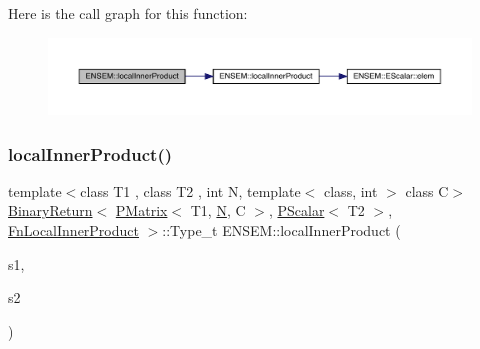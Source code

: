 Here is the call graph for this function\+:\nopagebreak
\begin{figure}[H]
\begin{center}
\leavevmode
\includegraphics[width=350pt]{df/d0a/group__primmatrix_ga8ba784b1249c948dcff5b8fe086e2eb5_cgraph}
\end{center}
\end{figure}
\mbox{\label{group__primmatrix_gafc7ce30ddacb0b13e2db237cfa268161}} 
\subsubsection{\texorpdfstring{localInnerProduct()}{localInnerProduct()}\hspace{0.1cm}{\footnotesize\ttfamily [2/3]}}
{\footnotesize\ttfamily template$<$class T1 , class T2 , int N, template$<$ class, int $>$ class C$>$ \\
\mbox{\hyperlink{structENSEM_1_1BinaryReturn}{Binary\+Return}}$<$ \mbox{\hyperlink{classENSEM_1_1PMatrix}{P\+Matrix}}$<$ T1, \mbox{\hyperlink{operator__name__util_8cc_a7722c8ecbb62d99aee7ce68b1752f337}{N}}, C $>$, \mbox{\hyperlink{classENSEM_1_1PScalar}{P\+Scalar}}$<$ T2 $>$, \mbox{\hyperlink{structENSEM_1_1FnLocalInnerProduct}{Fn\+Local\+Inner\+Product}} $>$\+::Type\+\_\+t E\+N\+S\+E\+M\+::local\+Inner\+Product (\begin{DoxyParamCaption}\item[{const \mbox{\hyperlink{classENSEM_1_1PMatrix}{P\+Matrix}}$<$ T1, \mbox{\hyperlink{operator__name__util_8cc_a7722c8ecbb62d99aee7ce68b1752f337}{N}}, C $>$ \&}]{s1,  }\item[{const \mbox{\hyperlink{classENSEM_1_1PScalar}{P\+Scalar}}$<$ T2 $>$ \&}]{s2 }\end{DoxyParamCaption})\hspace{0.3cm}{\ttfamily [inline]}}

